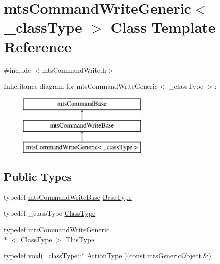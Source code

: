 \hypertarget{classmts_command_write_generic}{\section{mts\-Command\-Write\-Generic$<$ \-\_\-class\-Type $>$ Class Template Reference}
\label{classmts_command_write_generic}
}


{\ttfamily \#include $<$mts\-Command\-Write.\-h$>$}

Inheritance diagram for mts\-Command\-Write\-Generic$<$ \-\_\-class\-Type $>$\-:\begin{figure}[H]
\begin{center}
\leavevmode
\includegraphics[height=3.000000cm]{d9/d24/classmts_command_write_generic}
\end{center}
\end{figure}
\subsection*{Public Types}
\begin{DoxyCompactItemize}
\item 
typedef \hyperlink{classmts_command_write_base}{mts\-Command\-Write\-Base} \hyperlink{classmts_command_write_generic_aa2dd1b534b1f880987ed8b47edbc6b8b}{Base\-Type}
\item 
typedef \-\_\-class\-Type \hyperlink{classmts_command_write_generic_ab4ffe009b7558cff08d309ba7dfb1235}{Class\-Type}
\item 
typedef \hyperlink{classmts_command_write_generic}{mts\-Command\-Write\-Generic}\\*
$<$ \hyperlink{classmts_command_write_generic_ab4ffe009b7558cff08d309ba7dfb1235}{Class\-Type} $>$ \hyperlink{classmts_command_write_generic_adaaf201d0985787a45e6b4177f724972}{This\-Type}
\item 
typedef void(\-\_\-class\-Type\-::$\ast$ \hyperlink{classmts_command_write_generic_abb623932928545068e6df1074d9990e9}{Action\-Type} )(const \hyperlink{classmts_generic_object}{mts\-Generic\-Object} \&)
\end{DoxyCompactItemize}
